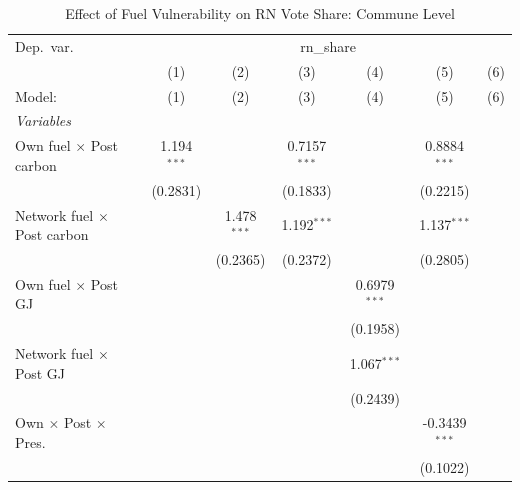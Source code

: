 \begin{table}[htbp]
   \caption{Effect of Fuel Vulnerability on RN Vote Share: Commune Level}
   \centering
   \begin{tabular}{lcccccc}
      \tabularnewline \midrule \midrule
      Dep.\ var. & \multicolumn{6}{c}{rn\_share}\\
                                                   & (1)           & (2)           & (3)            & (4)            & (5)             & (6) \\   
      Model:                                       & (1)           & (2)           & (3)            & (4)            & (5)             & (6)\\  
      \midrule
      \emph{Variables}\\
      Own fuel $\times$ Post carbon                & 1.194$^{***}$ &               & 0.7157$^{***}$ &                & 0.8884$^{***}$  &   \\   
                                                   & (0.2831)      &               & (0.1833)       &                & (0.2215)        &   \\   
      Network fuel $\times$ Post carbon            &               & 1.478$^{***}$ & 1.192$^{***}$  &                & 1.137$^{***}$   &   \\   
                                                   &               & (0.2365)      & (0.2372)       &                & (0.2805)        &   \\   
      Own fuel $\times$ Post GJ                    &               &               &                & 0.6979$^{***}$ &                 &   \\   
                                                   &               &               &                & (0.1958)       &                 &   \\   
      Network fuel $\times$ Post GJ                &               &               &                & 1.067$^{***}$  &                 &   \\   
                                                   &               &               &                & (0.2439)       &                 &   \\   
      Own $\times$ Post $\times$ Pres.             &               &               &                &                & -0.3439$^{***}$ &   \\   
                                                   &               &               &                &                & (0.1022)        &   \\   

\end{tabular}
\end{table}
